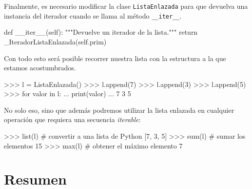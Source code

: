 Finalmente, es necesario modificar la clase \lstinline!ListaEnlazada! para que
devuelva una instancia del iterador
cuando se llama al método \lstinline!__iter__!.

\begin{codigo-python-sn}
    def __iter__(self):
        """Devuelve un iterador de la lista."""
        return _IteradorListaEnlazada(self.prim)
\end{codigo-python-sn}

Con todo esto será posible recorrer nuestra lista con la estructura a la
que estamos acostumbrados.

\begin{codigo-python-sn}
>>> l = ListaEnlazada()
>>> l.append(7)
>>> l.append(3)
>>> l.append(5)
>>> for valor in l:
...     print(valor)
...
7
3
5
\end{codigo-python-sn}

No solo eso, sino que además podremos utilizar la lista enlazada en cualquier
operación que requiera una secuencia \emph{iterable}:

\begin{codigo-python-sn}
>>> list(l) # convertir a una lista de Python
[7, 3, 5]
>>> sum(l) # sumar los elementos
15
>>> max(l) # obtener el máximo elemento
7
\end{codigo-python-sn}

\section{Resumen}

